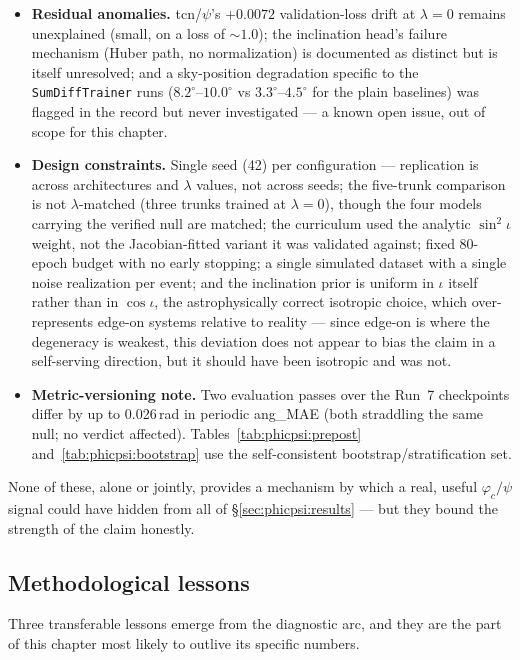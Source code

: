 \begin{itemize}
\item \textbf{Residual anomalies.} tcn/$\psi$'s $+0.0072$ validation-loss drift at $\lambda = 0$ remains unexplained (small, on a loss of ${\sim}1.0$); the inclination head's failure mechanism (Huber path, no normalization) is documented as distinct but is itself unresolved; and a sky-position degradation specific to the \texttt{SumDiffTrainer} runs ($8.2^\circ$--$10.0^\circ$ vs $3.3^\circ$--$4.5^\circ$ for the plain baselines) was flagged in the record but never investigated --- a known open issue, out of scope for this chapter.
\item \textbf{Design constraints.}
Single seed (42) per configuration --- replication is across architectures and $\lambda$ values, not across seeds; the five-trunk comparison is not $\lambda$-matched (three trunks trained at $\lambda = 0$), though the four models carrying the verified null are matched; the curriculum used the analytic $\sin^2\iota$ weight, not the Jacobian-fitted variant it was validated against; fixed 80-epoch budget with no early stopping; a single simulated dataset with a single noise realization per event; and the inclination prior is uniform in $\iota$ itself rather than in $\cos\iota$, the astrophysically correct isotropic choice, which over-represents edge-on systems relative to reality --- since edge-on is where the degeneracy is weakest, this deviation does not appear to bias the claim in a self-serving direction, but it should have been isotropic and was not.
\item \textbf{Metric-versioning note.}
Two evaluation passes over the Run~7 checkpoints differ by up to 0.026\,rad in periodic ang\_MAE (both straddling the same null; no verdict affected).
Tables~\ref{tab:phicpsi:prepost} and~\ref{tab:phicpsi:bootstrap} use the self-consistent bootstrap/stratification set.
\end{itemize}
None of these, alone or jointly, provides a mechanism by which a real, useful $\varphi_c/\psi$ signal could have hidden from all of \S\ref{sec:phicpsi:results} --- but they bound the strength of the claim honestly.

\subsection{Methodological lessons}\label{subsec:methodological-lessons}

Three transferable lessons emerge from the diagnostic arc, and they are the part of this chapter most likely to outlive its specific numbers.


